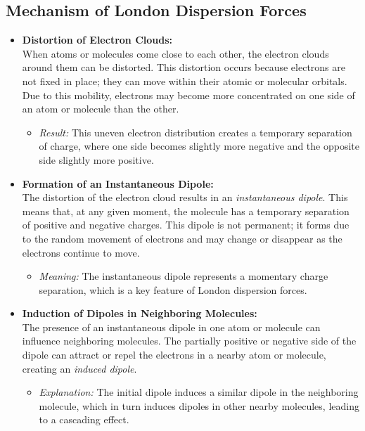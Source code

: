 \documentclass{report}
\begin{document}
\subsection{Mechanism of London Dispersion Forces}

\begin{itemize}
	\item \textbf{Distortion of Electron Clouds:} \\
	      When atoms or molecules come close to each other, the electron clouds around them can be distorted. This distortion occurs because electrons are not fixed in place; they can move within their atomic or molecular orbitals. Due to this mobility, electrons may become more concentrated on one side of an atom or molecule than the other.

	      \begin{itemize}
		      \item \textit{Result:} This uneven electron distribution creates a temporary separation of charge, where one side becomes slightly more negative and the opposite side slightly more positive.
	      \end{itemize}

	\item \textbf{Formation of an Instantaneous Dipole:} \\
	      The distortion of the electron cloud results in an \textit{instantaneous dipole}. This means that, at any given moment, the molecule has a temporary separation of positive and negative charges. This dipole is not permanent; it forms due to the random movement of electrons and may change or disappear as the electrons continue to move.

	      \begin{itemize}
		      \item \textit{Meaning:} The instantaneous dipole represents a momentary charge separation, which is a key feature of London dispersion forces.
	      \end{itemize}

	\item \textbf{Induction of Dipoles in Neighboring Molecules:} \\
	      The presence of an instantaneous dipole in one atom or molecule can influence neighboring molecules. The partially positive or negative side of the dipole can attract or repel the electrons in a nearby atom or molecule, creating an \textit{induced dipole}.

	      \begin{itemize}
		      \item \textit{Explanation:} The initial dipole induces a similar dipole in the neighboring molecule, which in turn induces dipoles in other nearby molecules, leading to a cascading effect.
	      \end{itemize}


\end{itemize}
\end{document}
